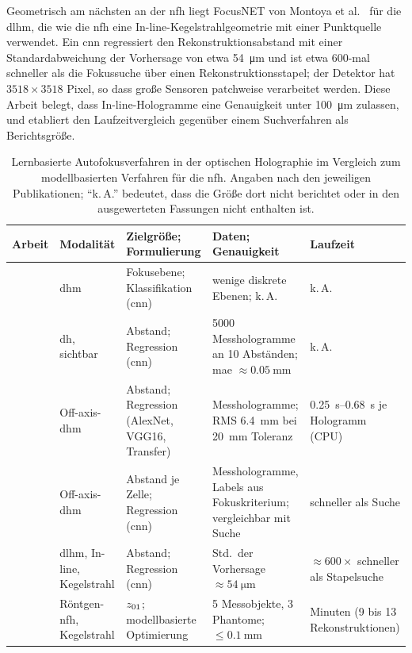 Geometrisch am nächsten an der \ac{nfh} liegt FocusNET von
Montoya et al.\ \cite{montoya2023focusnet} für die \acf{dlhm}, die wie die \ac{nfh} eine
In-line-Kegelstrahlgeometrie mit einer Punktquelle verwendet. Ein \ac{cnn}
regressiert den Rekonstruktionsabstand mit einer Standardabweichung der
Vorhersage von etwa \qty{54}{\micro\metre} und ist etwa 600-mal schneller
als die Fokussuche über einen Rekonstruktionsstapel; der Detektor hat
$3518 \times 3518$ Pixel, so dass große Sensoren patchweise verarbeitet
werden. Diese Arbeit belegt, dass In-line-Hologramme eine Genauigkeit unter
\qty{100}{\micro\metre} zulassen, und etabliert den Laufzeitvergleich
gegenüber einem Suchverfahren als Berichtsgröße.

\begin{table}[tb]
  \centering
  \caption[Lernbasierte Autofokusverfahren in der digitalen Holographie]{%
    Lernbasierte Autofokusverfahren in der optischen Holographie im Vergleich
    zum modellbasierten Verfahren für die \ac{nfh}. Angaben nach den
    jeweiligen Publikationen; \enquote{k.\,A.} bedeutet, dass die Größe dort
    nicht berichtet oder in den ausgewerteten Fassungen nicht enthalten ist.}
  \label{tab:stand:dl-vergleich}
  \footnotesize
  \begin{tabular}{@{}L{1.3cm} L{2.2cm} L{2.6cm} L{4.2cm} L{2.6cm}@{}}
    \toprule
    Arbeit & Modalität & Zielgröße; Formulierung & Daten; Genauigkeit & Laufzeit \\
    \midrule
    \cite{pitkaaho2017performance} & \acs{dhm} & Fokusebene; Klassifikation (\acs{cnn}) & wenige diskrete Ebenen; k.\,A. & k.\,A. \\
    \addlinespace
    \cite{ren2018learning} & \acs{dh}, sichtbar & Abstand; Regression (\acs{cnn}) & 5000 Messhologramme an 10 Abständen; \acs{mae} $\approx \qty{0.05}{\milli\metre}$ & k.\,A. \\
    \addlinespace
    \cite{pitkaaho2019focus} & Off-axis-\acs{dhm} & Abstand; Regression (AlexNet, VGG16, Transfer) & Messhologramme; RMS \qty{6.4}{\milli\metre} bei \qty{20}{\milli\metre} Toleranz & \qtyrange{0.25}{0.68}{\second} je Hologramm (CPU) \\
    \addlinespace
    \cite{jaferzadeh2019nosearch} & Off-axis-\acs{dhm} & Abstand je Zelle; Regression (\acs{cnn}) & Messhologramme, Labels aus Fokuskriterium; vergleichbar mit Suche & schneller als Suche \\
    \addlinespace
    \cite{montoya2023focusnet} & \acs{dlhm}, In-line, Kegelstrahl & Abstand; Regression (\acs{cnn}) & Std.\ der Vorhersage $\approx \qty{54}{\micro\metre}$ & $\approx 600\times$ schneller als Stapelsuche \\
    \midrule
    \cite{dora2025autofocus} & Röntgen-\acs{nfh}, Kegelstrahl & $z_{01}$; modellbasierte Optimierung & 5 Messobjekte, 3 Phantome; $\le \qty{0.1}{\milli\metre}$ & Minuten (9 bis 13 Rekonstruktionen) \\
    \bottomrule
  \end{tabular}
\end{table}

